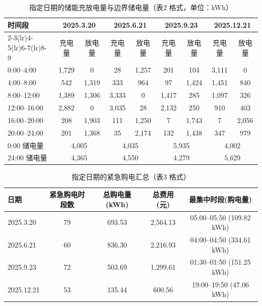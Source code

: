 \documentclass[zihao=-4,a4paper,UTF8,fontset=none]{ctexart}
\begin{document}
\begin{table}[H]
  \centering
  \caption{指定日期的储能充放电量与边界储电量（表2 格式，单位：kWh）}
  \label{tab:q3_days2}
  \footnotesize
  \begin{tabular}{lcccccccc}
    \toprule
    \multirow{2}{*}{时间段} & \multicolumn{2}{c}{2025.3.20} & \multicolumn{2}{c}{2025.6.21} & \multicolumn{2}{c}{2025.9.23} & \multicolumn{2}{c}{2025.12.21} \\
    \cmidrule(lr){2-3}\cmidrule(lr){4-5}\cmidrule(lr){6-7}\cmidrule(lr){8-9}
    & 充电量 & 放电量 & 充电量 & 放电量 & 充电量 & 放电量 & 充电量 & 放电量 \\
    \midrule
    0:00--4:00   & 1,729 & 0 & 28 & 1,257 & 201 & 104 & 3,111 & 0 \\
    4:00--8:00   & 542 & 1,319 & 333 & 964 & 97 & 1,424 & 1,451 & 840 \\
    8:00--12:00  & 1,389 & 1,306 & 3,333 & 0 & 1,417 & 285 & 1,097 & 326 \\
    12:00--16:00 & 2,882 & 0 & 3,035 & 28 & 2,132 & 250 & 910 & 403 \\
    16:00--20:00 & 208 & 1,903 & 111 & 1,250 & 7 & 1,743 & 7 & 2,056 \\
    20:00--24:00 & 201 & 1,368 & 35 & 2,174 & 132 & 1,438 & 347 & 979 \\
    \midrule
    0:00 储电量   & \multicolumn{2}{c}{4,005} & \multicolumn{2}{c}{4,035} & \multicolumn{2}{c}{5,935} & \multicolumn{2}{c}{4,002} \\
    24:00 储电量  & \multicolumn{2}{c}{4,365} & \multicolumn{2}{c}{4,550} & \multicolumn{2}{c}{4,279} & \multicolumn{2}{c}{5,629} \\
    \bottomrule
  \end{tabular}
\end{table}

\begin{table}[H]
  \centering
  \caption{指定日期的紧急购电汇总（表3 格式）}
  \label{tab:q3_days3}
  \footnotesize
  \begin{tabular}{lcccc}
    \toprule
    日期 & 紧急购电时段数 & 总购电量(kWh) & 总费用(元) & 最集中时段(购电量) \\
    \midrule
    2025.3.20 & 79 & 693.53 & 2,564.13 & 05:00--05:50 (109.82 kWh) \\
    2025.6.21 & 60 & 836.30 & 2,216.93 & 04:00--04:50 (334.61 kWh) \\
    2025.9.23 & 72 & 503.69 & 1,299.61 & 01:30--01:50 (151.25 kWh) \\
    2025.12.21 & 53 & 135.44 & 600.56 & 19:00--19:50 (47.06 kWh) \\
    \bottomrule
  \end{tabular}
\end{table}
\end{document}
